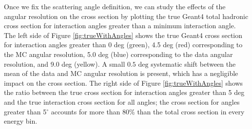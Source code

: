Once we fix the scattering angle definition, we can study the effects of the angular resolution on the cross section by plotting the true Geant4 total hadronic cross section for interaction angles greater than a minimum interaction angle. The left side of Figure \ref{fig:trueWithAngles} shows the  true Geant4 cross section  for interaction angles greater than 0 deg (green), 4.5 deg (red) corresponding to the MC angular resolution, 5.0 deg  (blue) corresponding to the data angular resolution, and 9.0 deg (yellow).  A small $0.5 \text{ deg}$ systematic shift between the mean of the data and MC angular resolution is present, which has a negligible impact on the cross section. The right side of Figure \ref{fig:trueWithAngles} shows the ratio between the  true cross section for interaction angles greater than 5 deg and the true interaction cross section for all angles;  the cross section for angles greater than 5$^\circ$ accounts for more than 80\% than the total cross section in every energy bin.



